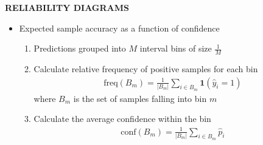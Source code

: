 \begin{whitebox}{\textbf{RELIABILITY DIAGRAMS}}
    \begin{center}
    \end{center}
    \begin{itemize}
        \item Expected sample accuracy as a function of confidence
        \begin{enumerate}
            \item Predictions grouped into $M$ interval bins of size $\frac{1}{M}$
            \item Calculate relative frequency of positive samples for each bin
            \begin{align*}
                \mathrm{freq}(B_m)=\frac{1}{|B_m|}\sum_{i\in B_m}\bm{1}(\hat{y}_i=1)
            \end{align*}
            where $B_m$ is the set of samples falling into bin $m$
            \item Calculate the average confidence within the bin
            \begin{align*}
                \mathrm{conf}(B_m)=\frac{1}{|B_m|}\sum_{i\in B_m}\hat{p}_i
            \end{align*}
        \end{enumerate}
    \end{itemize}
\end{whitebox}

